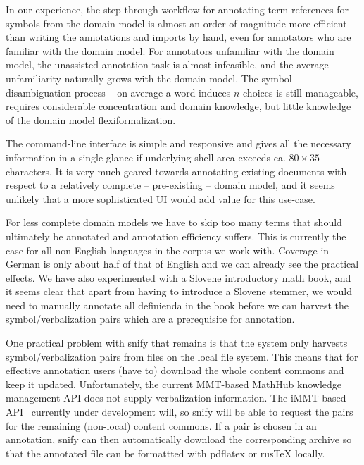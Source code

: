 \documentclass{llncs}
\newcommand\snify{\textsf{snify}\xspace}
\begin{document}
In our experience, the step-through workflow for annotating term references for symbols
from the domain model is almost an order of magnitude more efficient than writing the
annotations and imports by hand, even for annotators who are familiar with the domain
model. For annotators unfamiliar with the domain model, the unassisted annotation task is
almost infeasible, and the average unfamiliarity naturally grows with the domain
model. The symbol disambiguation process -- on average a word induces $n$ choices is still manageable,
requires considerable concentration and domain knowledge, but little knowledge of the
domain model flexiformalization.

The command-line interface is simple and responsive and gives all the necessary
information in a single glance if underlying shell area exceeds ca. $80\times 35$
characters. It is very much geared towards annotating existing documents with respect to a
relatively complete -- pre-existing -- domain model, and it seems unlikely that a more
sophisticated UI would add value for this use-case.

For less complete domain models we have to skip too many terms that should ultimately be
annotated and annotation efficiency suffers. This is currently the case for all
non-English languages in the \sTeX corpus we work with. Coverage in German is only about
half of that of English and we can already see the practical effects. We have also
experimented with a Slovene introductory math book, and it seems clear that apart from
having to introduce a Slovene stemmer, we would need to manually annotate all
definienda in the book before we can harvest the symbol/verbalization pairs which are a
prerequisite for annotation.

One practical problem with \snify that remains is that the system only harvests
symbol/verbalization pairs from \sTeX files on the local file system. This means that for
effective annotation users (have to) download the whole content commons and keep it
updated. Unfortunately, the current MMT-based MathHub knowledge management
API does not supply verbalization information. The iMMT-based
API~\cite{iMMT:on} currently under development will, so \snify will be able to request the
pairs for the remaining (non-local) content commons. If a pair is chosen in an annotation,
\snify can then automatically download the corresponding archive so that the annotated
file can be formattted with pdflatex or rusTeX locally.
\end{document}
